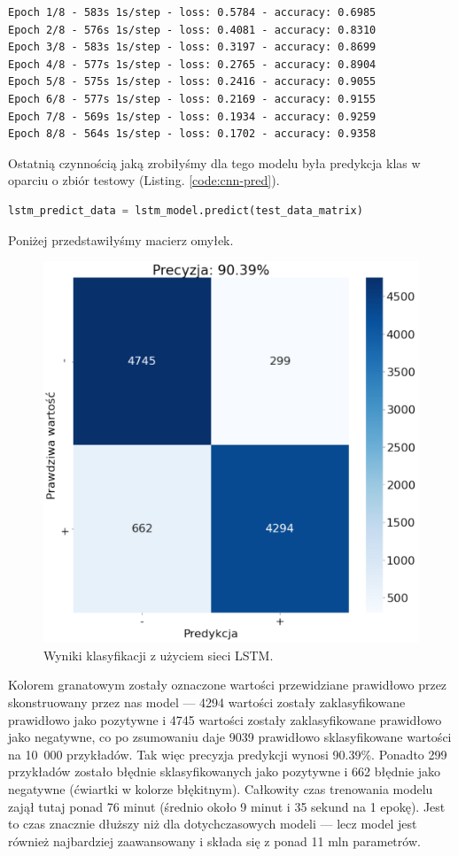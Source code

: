 \begin{Verbatim}
Epoch 1/8 - 583s 1s/step - loss: 0.5784 - accuracy: 0.6985
Epoch 2/8 - 576s 1s/step - loss: 0.4081 - accuracy: 0.8310
Epoch 3/8 - 583s 1s/step - loss: 0.3197 - accuracy: 0.8699
Epoch 4/8 - 577s 1s/step - loss: 0.2765 - accuracy: 0.8904
Epoch 5/8 - 575s 1s/step - loss: 0.2416 - accuracy: 0.9055
Epoch 6/8 - 577s 1s/step - loss: 0.2169 - accuracy: 0.9155
Epoch 7/8 - 569s 1s/step - loss: 0.1934 - accuracy: 0.9259
Epoch 8/8 - 564s 1s/step - loss: 0.1702 - accuracy: 0.9358
\end{Verbatim}

\noindent Ostatnią czynnością jaką zrobiłyśmy dla tego modelu była predykcja klas w oparciu o zbiór testowy (Listing. \ref{code:cnn-pred}).

\begin{lstlisting}[language=Python,frame=single, breaklines=true, caption=Predykcja z użyciem modelu LSTM.,label=code:lstm-pred]
lstm_predict_data = lstm_model.predict(test_data_matrix)
\end{lstlisting}

Poniżej przedstawiłyśmy macierz omyłek.

\begin{figure}[H]
	\centering
	\includegraphics[width=0.5\linewidth]{images/chapter3/lstm-macierz.pdf}
	\caption{Wyniki klasyfikacji z użyciem sieci LSTM.}
	\label{fig:lstm-macierz}
\end{figure}

\noindent Kolorem granatowym zostały oznaczone wartości przewidziane prawidłowo przez skonstruowany przez nas model --- 4294 wartości zostały zaklasyfikowane prawidłowo jako pozytywne i 4745 wartości zostały zaklasyfikowane prawidłowo jako negatywne, co po zsumowaniu daje 9039 prawidłowo sklasyfikowane wartości na 10~000 przykładów. Tak więc precyzja predykcji wynosi 90.39\%. Ponadto 299 przykładów zostało błędnie sklasyfikowanych jako pozytywne i 662 błędnie jako negatywne (ćwiartki w kolorze błękitnym). Całkowity czas trenowania modelu zajął tutaj ponad 76 minut (średnio około 9 minut i 35 sekund na 1 epokę). Jest to czas znacznie dłuższy niż dla dotychczasowych modeli --- lecz model jest również najbardziej zaawansowany i składa się z ponad 11 mln parametrów.


